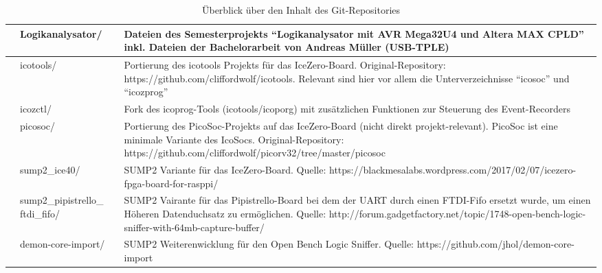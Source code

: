 \begin{table}[h]
\begin{tabular}{|p{1cm}|p{3cm}|p{10cm}|}
            & Logikanalysator/                & Dateien des Semesterprojekts ``Logikanalysator mit AVR Mega32U4 und Altera MAX CPLD''  inkl. Dateien der Bachelorarbeit von Andreas Müller (USB-TPLE)  
															     \\ \hline
            & icotools/                       & Portierung des icotools Projekts für das IceZero-Board. Original-Repository: https://github.com/cliffordwolf/icotools. Relevant sind hier vor allem die Unterverzeichnisse ``icosoc'' und ``icozprog'' 
\\ \hline
            & icozctl/                        & Fork des icoprog-Tools (icotools/icoporg) mit zusätzlichen Funktionen zur Steuerung des Event-Recorders                                                                                                                                                                                                                  \\ \hline
            & picosoc/                        & Portierung des PicoSoc-Projekts auf das IceZero-Board (nicht direkt projekt-relevant). PicoSoc ist eine minimale Variante des IcoSocs. Original-Repository: https://github.com/cliffordwolf/picorv32/tree/master/picosoc                                                    \\ \hline
            & sump2\_ice40/                          & SUMP2 Variante für das IceZero-Board. Quelle: https://blackmesalabs.wordpress.com/2017/02/07/icezero-fpga-board-for-rasppi/                                                                                                                                                                                                                                                    \\ \hline
            & sump2\_pipistrello\_ ftdi\_fifo/ & SUMP2 Vairante für das Pipistrello-Board bei dem der UART durch einen FTDI-Fifo ersetzt wurde, um einen Höheren Datenduchsatz zu ermöglichen. Quelle: http://forum.gadgetfactory.net/topic/1748-open-bench-logic-sniffer-with-64mb-capture-buffer/ \\ \hline
            & demon-core-import/              & SUMP2 Weiterenwicklung für den Open Bench Logic Sniffer. Quelle: https://github.com/jhol/demon-core-import                                                                                                                                                                     \\ \hline
\end{tabular}
\caption{Überblick über den Inhalt des Git-Repositories}
\label{tbl:git_repo}
\end{table}
